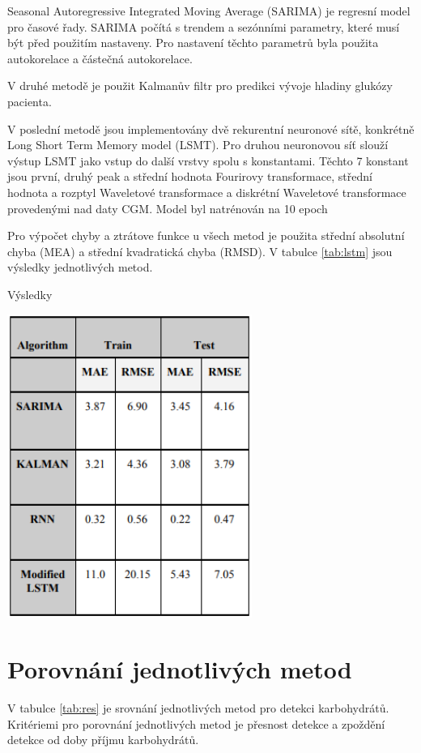 Seasonal Autoregressive Integrated Moving Average (SARIMA) je regresní model pro časové řady. SARIMA počítá s trendem a sezónními parametry, které musí být před použitím nastaveny. Pro nastavení těchto parametrů byla použita autokorelace a částečná autokorelace.

V druhé metodě je použit Kalmanův filtr pro predikci vývoje hladiny glukózy pacienta.

V poslední metodě jsou implementovány dvě rekurentní neuronové sítě, konkrétně Long Short Term Memory model (LSMT). Pro druhou neuronovou síť slouží výstup LSMT jako vstup do další vrstvy spolu s konstantami. Těchto 7 konstant jsou první, druhý peak a střední hodnota Fourirovy transformace, střední hodnota a rozptyl Waveletové transformace a diskrétní Waveletové transformace provedenými nad daty CGM. Model byl natrénován na 10 epoch

Pro výpočet chyby a ztrátove funkce u všech metod je použita střední absolutní chyba (MEA) a střední kvadratická chyba (RMSD). V tabulce \ref{tab:lstm} jsou výsledky jednotlivých metod.

\begin{table}[H]
\caption{Výsledky}
\label{tab:lstm}
\centering
\includegraphics[width=0.6\textwidth]{img/analyza/lstm.png}
\end{table}


\section{Porovnání jednotlivých metod}

V tabulce \ref{tab:res} je srovnání jednotlivých metod pro detekci karbohydrátů. Kritériemi pro porovnání jednotlivých metod je přesnost detekce a zpoždění detekce od doby příjmu karbohydrátů.

